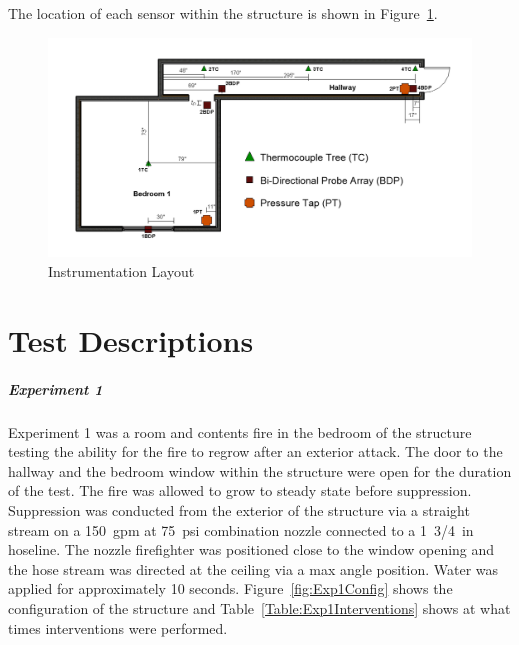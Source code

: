 \documentclass[12pt,oneside]{book}
\begin{document}
The location of each sensor within the structure is shown in Figure~\ref{fig:InstrumentDim}.

\begin{figure}[H]
	\centering
	\includegraphics[width=\textwidth]{Figures/Instrumentation/Instrument_Dimensions.png}
	\caption{Instrumentation Layout}
	\label{fig:InstrumentDim}
\end{figure}

\clearpage

\chapter{Test Descriptions}

\paragraph{Experiment 1} \mbox{}

Experiment 1 was a room and contents fire in the bedroom of the structure testing the ability for the fire to regrow after an exterior attack. The door to the hallway and the bedroom window within the structure were open for the duration of the test. The fire was allowed to grow to steady state before suppression. Suppression was conducted from the exterior of the structure via a straight stream on a 150~gpm at 75~psi combination nozzle connected to a 1~3/4~in hoseline. The nozzle firefighter was positioned close to the window opening and the hose stream was directed at the ceiling via a max angle position. Water was applied for approximately 10 seconds. Figure~\ref{fig:Exp1Config} shows the configuration of the structure and Table~\ref{Table:Exp1Interventions} shows at what times interventions were performed. 

\end{document}
